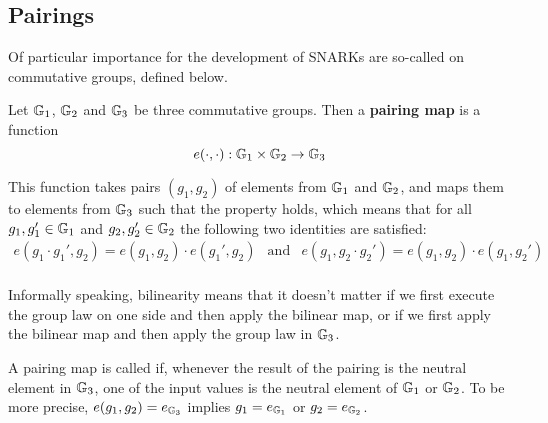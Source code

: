 \subsection{Pairings}
Of particular importance for the development of SNARKs are so-called  on commutative groups, defined below.

\begin{definition}\label{def:pairing-map} 
Let $\mathbb{G}_1$, $\mathbb{G}_2$ and $\mathbb{G}_3$ be three commutative groups. Then a \textbf{pairing map} is a function
\begin{equation}\label{pairing-map}
e(\cdot,\cdot): \mathbb{G}_1 \times \mathbb{G}_2 \to \mathbb{G}_3
\end{equation}

This function takes pairs $(g_1,g_2)$ of elements from $\mathbb{G}_1$ and $\mathbb{G}_2$, and maps them to elements from $\mathbb{G}_3$ such that the  property holds, which means that for all $g_1,g_1'\in \mathbb{G}_1$ and $g_2, g_2'\in \mathbb{G}_2$ the following two identities are satisfied:
\begin{equation}\label{eq:bilinearity}
\begin{array}{lcr}
e(g_1 \cdot g_1',g_2)= e(g_1,g_2)\cdot e(g_1',g_2) &\text{and}&
e(g_1,g_2 \cdot g_2')= e(g_1,g_2)\cdot e(g_1,g_2')\\
\end{array}
\end{equation}
\end{definition}

Informally speaking, bilinearity means that it doesn't matter if we first execute the group law on one side and then apply the bilinear map, or if we first apply the bilinear map and then apply the group law in $\mathbb{G}_3$. 

A pairing map is called  if, whenever the result of the pairing is the neutral element in $\mathbb{G}_3$, one of the input values is the neutral element of $\mathbb{G}_1$ or $\mathbb{G}_2$. To be more precise, $e(g_1,g_2)=e_{\mathbb{G}_3}$ implies $g_1=e_{\mathbb{G}_1}$ or $g_2=e_{\mathbb{G}_2}$.

